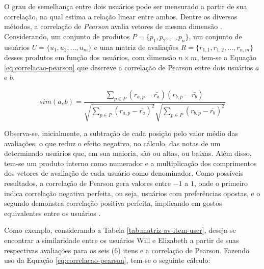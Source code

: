         O grau de semelhança entre dois usuários pode ser mensurado a partir de sua correlação, na qual estima a relação linear entre ambos. Dentre os diversos métodos, a correlação de \textit{Pearson} avalia vetores de mesma dimensão \cite{Ricci2010}. Considerando, um conjunto de produtos $P=\{p_1, p_2, ..., p_n\}$, um conjunto de usuários $U = \{u_1, u_2, ..., u_m\}$ e uma matriz de avaliações $R=\{r_{1,1}, r_{1,2}, ..., r_{n, m}\}$ desses produtos em função dos usuários, com dimensão  $n\times m$, tem-se a Equação \ref{eq:correlacao-pearson} que descreve a correlação de Pearson entre dois usuários $a$ e $b$.
             
        \begin{equation}
             sim(a, b) = \frac{\sum_{p\in P}(r_{a, p}-\bar{r_a})(r_{b, p}-\bar{r_b})}{\sqrt{\sum_{p\in P}(r_{a, p}-\bar{r_a})^2}\sqrt{\sum_{p\in P}(r_{b, p}-\bar{r_b})^2}}\label{eq:correlacao-pearson}
        \end{equation}
        
         Observa-se, inicialmente, a subtração de cada posição pelo valor médio das avaliações, o que reduz o efeito negativo, no cálculo, das notas de um determinado usuários que, em sua maioria, são ou altas, ou baixas. Além disso, tem-se um produto interno como numerador e a multiplicação dos comprimentos dos vetores de avaliação de cada usuário como denominador. Como possíveis resultados, a correlação de Pearson gera valores entre $-1$ a $1$, onde o primeiro indica correlação negativa perfeita, ou seja, usuários com preferências opostas, e o segundo demonstra correlação positiva perfeita, implicando em gostos equivalentes entre os usuários \cite{Jannach2010}.
        
        
        Como exemplo, considerando a Tabela \ref{tab:matriz-av-item-user}, deseja-se encontrar a similaridade entre os usuários Will e Elizabeth a partir de suas respectivas avaliações para os seis (6) itens e a correlação de Pearson. Fazendo uso da Equação \ref{eq:correlacao-pearson}, tem-se o seguinte cálculo:
        
